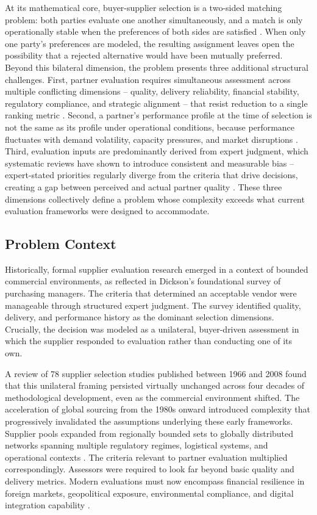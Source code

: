\documentclass[11pt]{article}
\begin{document}
At its mathematical core, buyer-supplier selection is a two-sided matching problem: both parties evaluate one another simultaneously, and a match is only operationally stable when the preferences of both sides are satisfied \cite{ref8}. When only one party's preferences are modeled, the resulting assignment leaves open the possibility that a rejected alternative would have been mutually preferred. Beyond this bilateral dimension, the problem presents three additional structural challenges. First, partner evaluation requires simultaneous assessment across multiple conflicting dimensions -- quality, delivery reliability, financial stability, regulatory compliance, and strategic alignment -- that resist reduction to a single ranking metric \cite{ref9}. Second, a partner's performance profile at the time of selection is not the same as its profile under operational conditions, because performance fluctuates with demand volatility, capacity pressures, and market disruptions \cite{ref10}. Third, evaluation inputs are predominantly derived from expert judgment, which systematic reviews have shown to introduce consistent and measurable bias -- expert-stated priorities regularly diverge from the criteria that drive decisions, creating a gap between perceived and actual partner quality \cite{ref11}. These three dimensions collectively define a problem whose complexity exceeds what current evaluation frameworks were designed to accommodate.

\subsection{Problem Context}

Historically, formal supplier evaluation research emerged in a context of bounded commercial environments, as reflected in Dickson's \cite{ref12} foundational survey of purchasing managers. The criteria that determined an acceptable vendor were manageable through structured expert judgment. The survey identified quality, delivery, and performance history as the dominant selection dimensions. Crucially, the decision was modeled as a unilateral, buyer-driven assessment in which the supplier responded to evaluation rather than conducting one of its own.

A review of 78 supplier selection studies published between 1966 and 2008 \cite{ref9} found that this unilateral framing persisted virtually unchanged across four decades of methodological development, even as the commercial environment shifted. The acceleration of global sourcing from the 1980s onward introduced complexity that progressively invalidated the assumptions underlying these early frameworks. Supplier pools expanded from regionally bounded sets to globally distributed networks spanning multiple regulatory regimes, logistical systems, and operational contexts \cite{ref16}. The criteria relevant to partner evaluation multiplied correspondingly. Assessors were required to look far beyond basic quality and delivery metrics. Modern evaluations must now encompass financial resilience in foreign markets, geopolitical exposure, environmental compliance, and digital integration capability \cite{ref5,ref7}.
\end{document}

